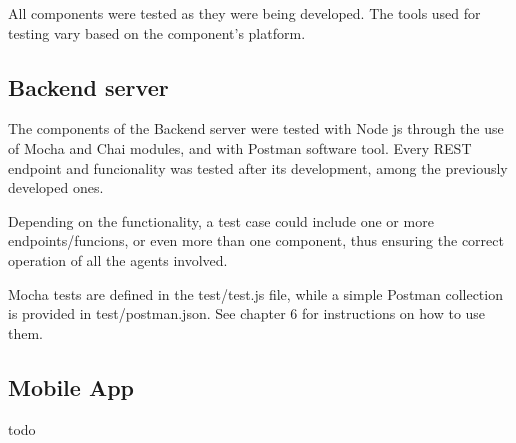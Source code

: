 \documentclass[../main.tex]{subfiles}
\begin{document}
All components were tested as they were being developed. The tools used for testing vary based on the component's platform.

\subsection{Backend server}

The components of the Backend server were tested with Node js through the use of Mocha and Chai modules, and with Postman software tool. Every REST endpoint and funcionality was tested after its development, among the previously developed ones.

Depending on the functionality, a test case could include one or more endpoints/funcions, or even more than one component, thus ensuring the correct operation of all the agents involved.

Mocha tests are defined in the test/test.js file, while a simple Postman collection is provided in test/postman.json. See chapter 6 for instructions on how to use them.

\subsection{Mobile App}

todo
\end{document}

